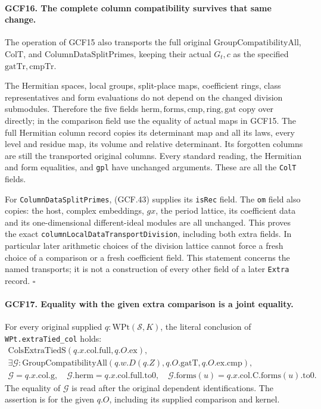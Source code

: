 \documentclass[11pt,a4paper]{article}
\numberwithin{equation}{section}
\theoremstyle{remark}\newtheorem{remark}[theorem]{Remark}
\begin{document}
\paragraph{GCF16. The complete column compatibility survives that same change.}
\label{claim:GCF16}
The operation of GCF15 also transports the full original
\(\mathrm{GroupCompatibilityAll}\), \(\mathrm{ColT}\), and
\(\mathrm{ColumnDataSplitPrimes}\), keeping their actual
\(G_t,c\) as the specified \(\mathrm{gatTr},\mathrm{cmpTr}\).

The Hermitian spaces, local groups, split-place maps, coefficient
rings, class representatives and form evaluations do not depend on
the changed division submodules.  Therefore the five fields
\(\mathrm{herm},\mathrm{forms},\mathrm{cmp},\mathrm{ring},
\mathrm{gat}\) copy over directly; in the comparison field use
the equality of actual maps in GCF15.  The full Hermitian column
record copies its determinant map and all its laws, every level
and residue map, its volume and relative determinant.  Its forgotten
columns are still the transported original columns.  Every standard
reading, the Hermitian and form equalities, and \texttt{gpl} have
unchanged arguments.  These are all the \texttt{Col\allowbreak T} fields.

For \texttt{Column\allowbreak Data\allowbreak Split\allowbreak Primes}, (GCF.43) supplies its
\texttt{is\allowbreak Rec} field.  The \texttt{om} field also copies: the host,
complex embeddings, \(gx\), the period lattice, its coefficient
data and its one-dimensional different-ideal modules are all
unchanged.  This proves the exact
\texttt{column\allowbreak Local\allowbreak Data\allowbreak Transport\allowbreak Division}, including both extra
fields.  In particular later arithmetic choices of the division
lattice cannot force a fresh choice of a comparison or a fresh
coefficient field.  This statement concerns the named transports;
it is not a construction of every other field of a later
\texttt{Extra} record.
\hfill\(\square\)

\paragraph{GCF17. Equality with the given extra comparison is a joint equality.}
\label{claim:GCF17}
For every original supplied \(q:\mathrm{WPt}(\mathcal S,K)\),
the literal conclusion of \texttt{WPt.\allowbreak extra\allowbreak Tied\_\allowbreak col} holds:
\[
 \begin{gathered}
  \mathrm{ColsExtraTiedS}(q.x.\mathrm{col.full},q.O.\mathrm{ex}),\\
  \exists\mathcal G:\mathrm{GroupCompatibilityAll}
                (q.w.D(q.Z),q.O.\mathrm{gatT},q.O.\mathrm{ex.cmp}),\\
  \mathcal G=q.x.\mathrm{col.g},\quad
  \mathcal G.\mathrm{herm}=q.x.\mathrm{col.full.to0},\quad
  \mathcal G.\mathrm{forms}(u)=q.x.\mathrm{col.C.forms}(u).\mathrm{to0}.
 \end{gathered}                                                   \tag{GCF.44}
\]
The equality of \(\mathcal G\) is read after the original dependent
identifications.  The assertion is for the given \(q.O\), including
its supplied comparison and kernel.
\end{document}
